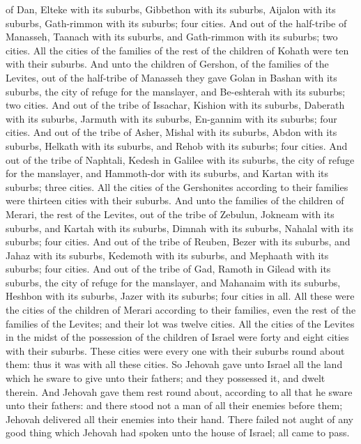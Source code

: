 of Dan, Elteke with its suburbs, Gibbethon with its suburbs, Aijalon with its suburbs, Gath-rimmon with its suburbs; four cities. And out of the half-tribe of Manasseh, Taanach with its suburbs, and Gath-rimmon with its suburbs; two cities. All the cities of the families of the rest of the children of Kohath were ten with their suburbs.  And unto the children of Gershon, of the families of the Levites, out of the half-tribe of Manasseh they gave Golan in Bashan with its suburbs, the city of refuge for the manslayer, and Be-eshterah with its suburbs; two cities. And out of the tribe of Issachar, Kishion with its suburbs, Daberath with its suburbs, Jarmuth with its suburbs, En-gannim with its suburbs; four cities. And out of the tribe of Asher, Mishal with its suburbs, Abdon with its suburbs, Helkath with its suburbs, and Rehob with its suburbs; four cities. And out of the tribe of Naphtali, Kedesh in Galilee with its suburbs, the city of refuge for the manslayer, and Hammoth-dor with its suburbs, and Kartan with its suburbs; three cities. All the cities of the Gershonites according to their families were thirteen cities with their suburbs.  And unto the families of the children of Merari, the rest of the Levites, out of the tribe of Zebulun, Jokneam with its suburbs, and Kartah with its suburbs, Dimnah with its suburbs, Nahalal with its suburbs; four cities. And out of the tribe of Reuben, Bezer with its suburbs, and Jahaz with its suburbs, Kedemoth with its suburbs, and Mephaath with its suburbs; four cities. And out of the tribe of Gad, Ramoth in Gilead with its suburbs, the city of refuge for the manslayer, and Mahanaim with its suburbs, Heshbon with its suburbs, Jazer with its suburbs; four cities in all. All these were the cities of the children of Merari according to their families, even the rest of the families of the Levites; and their lot was twelve cities.  All the cities of the Levites in the midst of the possession of the children of Israel were forty and eight cities with their suburbs. These cities were every one with their suburbs round about them: thus it was with all these cities.  So Jehovah gave unto Israel all the land which he sware to give unto their fathers; and they possessed it, and dwelt therein. And Jehovah gave them rest round about, according to all that he sware unto their fathers: and there stood not a man of all their enemies before them; Jehovah delivered all their enemies into their hand. There failed not aught of any good thing which Jehovah had spoken unto the house of Israel; all came to pass. 


